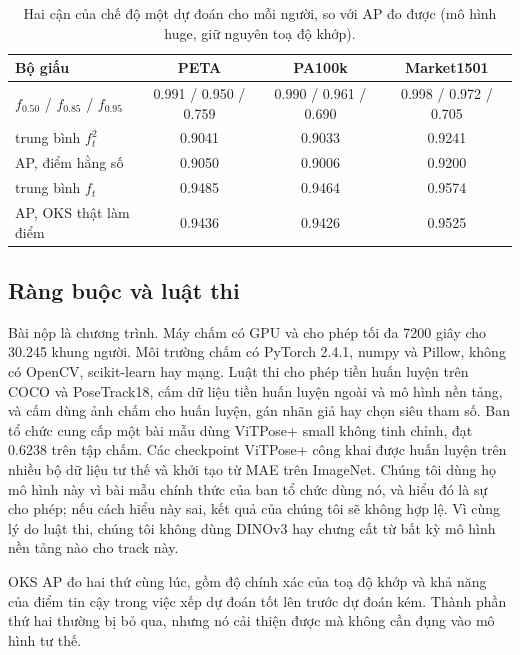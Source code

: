 \documentclass[11pt,a4paper]{article}
\begin{document}
\begin{table}[H]
\centering\small
\begin{tabular}{@{}lccc@{}}
\toprule
Bộ giấu & PETA & PA100k & Market1501 \\
\midrule
$f_{0.50}$ / $f_{0.85}$ / $f_{0.95}$ & 0.991 / 0.950 / 0.759 & 0.990 / 0.961 / 0.690 & 0.998 / 0.972 / 0.705 \\
trung bình $f_t^2$ & 0.9041 & 0.9033 & 0.9241 \\
AP, điểm hằng số & 0.9050 & 0.9006 & 0.9200 \\
trung bình $f_t$ & 0.9485 & 0.9464 & 0.9574 \\
AP, OKS thật làm điểm & 0.9436 & 0.9426 & 0.9525 \\
\bottomrule
\end{tabular}
\caption{Hai cận của chế độ một dự đoán cho mỗi người, so với AP đo được (mô hình huge, giữ nguyên toạ độ khớp).}
\label{tab:bounds}
\end{table}

\subsection{Ràng buộc và luật thi}

Bài nộp là chương trình. Máy chấm có GPU và cho phép tối đa 7200 giây cho 30.245 khung người. Môi trường chấm có PyTorch 2.4.1, numpy và Pillow, không có OpenCV, scikit-learn hay mạng. Luật thi cho phép tiền huấn luyện trên COCO và PoseTrack18, cấm dữ liệu tiền huấn luyện ngoài và mô hình nền tảng, và cấm dùng ảnh chấm cho huấn luyện, gán nhãn giả hay chọn siêu tham số. Ban tổ chức cung cấp một bài mẫu dùng ViTPose+ small không tinh chỉnh, đạt 0.6238 trên tập chấm. Các checkpoint ViTPose+ công khai được huấn luyện trên nhiều bộ dữ liệu tư thế và khởi tạo từ MAE trên ImageNet. Chúng tôi dùng họ mô hình này vì bài mẫu chính thức của ban tổ chức dùng nó, và hiểu đó là sự cho phép; nếu cách hiểu này sai, kết quả của chúng tôi sẽ không hợp lệ. Vì cùng lý do luật thi, chúng tôi không dùng DINOv3 hay chưng cất từ bất kỳ mô hình nền tảng nào cho track này.

\begin{ghichu}
OKS AP đo hai thứ cùng lúc, gồm độ chính xác của toạ độ khớp và khả năng của điểm tin cậy trong việc xếp dự đoán tốt lên trước dự đoán kém. Thành phần thứ hai thường bị bỏ qua, nhưng nó cải thiện được mà không cần đụng vào mô hình tư thế.
\end{ghichu}

\end{document}
